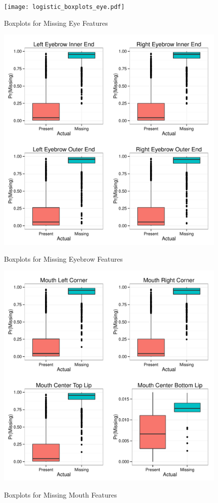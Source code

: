 \documentclass[conference]{IEEEtran}
\begin{document}
\begin{figure}[!ht]
  \centering
  \caption{Boxplots for Missing Eye Features}
  \texttt{[image: logistic\_boxplots\_eye.pdf]}
  \label{fig:logistic_boxplots_eye}
\end{figure}

\begin{figure}[!ht]
  \centering
  \caption{Boxplots for Missing Eyebrow Features}
  \includegraphics[scale=.5]{logistic_boxplots_eyebrow.pdf}
  \label{fig:logistic_boxplots_eyebrow}
\end{figure}

\begin{figure}[!ht]
  \centering
  \caption{Boxplots for Missing Mouth Features}
  \includegraphics[scale=.5]{logistic_boxplots_mouth.pdf}
  \label{fig:logistic_boxplots_mouth}
\end{figure}
\end{document}
